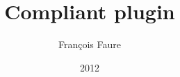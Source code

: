 \documentclass[a4paper,10pt]{article}
\title{Compliant plugin}
\author{François Faure}
\date{2012}
\begin{document}
\maketitle

\begin{abstract}

\end{abstract}


\end{document}
